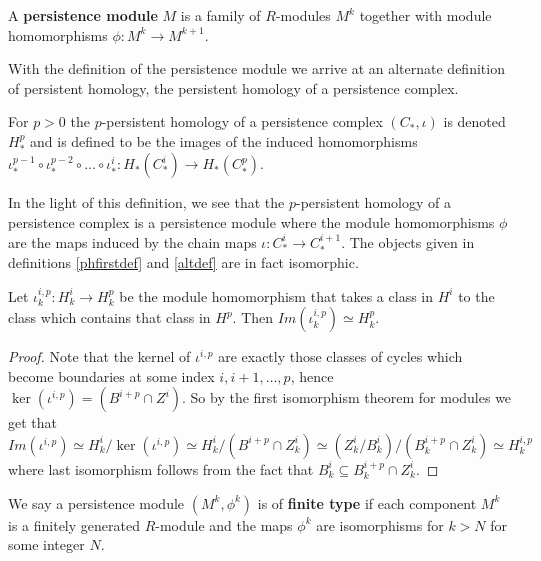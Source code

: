 \begin{definition}
  A \textbf{persistence module} $M$ is a family of $R$-modules $M^{k}$ together with module homomorphisms $\phi: M^{k} \to M^{k+1}$.
\end{definition}
With the definition of the persistence module we arrive at an alternate definition of persistent homology, the persistent homology of a persistence complex.
\begin{definition}\label{altdef} For $p>0$ the $p$-persistent homology of a persistence complex $(C_{*}, \iota)$ is denoted $H^{p}_{*}$ and is defined to be the images of the induced homomorphisms $\iota^{p-1}_{*} \circ \iota^{p-2}_{*} \circ \dots \circ \iota^{i}_{*}: H_{*}(C_{*}^{i}) \to H_{*}(C^{p}_{*})$.
\end{definition}
In the light of this definition, we see that the $p$-persistent homology of a persistence complex is a persistence module where the module homomorphisms $\phi$ are the maps induced by the chain maps $\iota: C^{i}_{*} \to C_{*}^{i+1}$. The objects given in definitions \ref{phfirstdef} and \ref{altdef} are in fact isomorphic.
\begin{lemma}
Let $\iota^{i,p}_k: H^{i}_{k} \to H^{p}_{k}$ be the module homomorphism that takes a class in $H^{i}$ to the class which contains that class in $H^{p}$. Then $Im (\iota^{i,p}_{k}) \simeq H^{p}_{k}$.
\end{lemma}
\begin{proof}
  Note that the kernel of $\iota^{{i,p}}$ are exactly those classes of cycles which become boundaries at some index $i,i+1,\dots,p$, hence $\ker (\iota^{i,p}) = (B^{i+p} \cap Z^{i})$. So by the first isomorphism theorem for modules we get that
  \[ Im (\iota^{i,p}) \simeq H^{i}_{k} / \ker(\iota^{i,p}) \simeq H^{i}_{k} / (B^{i+p} \cap Z_{k}^{i}) \simeq (Z^{i}_{k}/B^{i}_{k})/(B^{i+p}_{k}\cap Z^{i}_{k}) \simeq H^{i,p}_{k} \]
  where last isomorphism follows from the fact that $B^{i}_{k} \subseteq B_{k}^{i+p} \cap Z^{i}_{k}$.
\end{proof}

\begin{definition}
We say a persistence module $(M^{k}, \phi^{k})$ is of \textbf{finite type} if each component $M^{k}$ is a finitely generated $R$-module and the maps $\phi^{k}$ are isomorphisms for $k > N$ for some integer $N$.
\end{definition}

